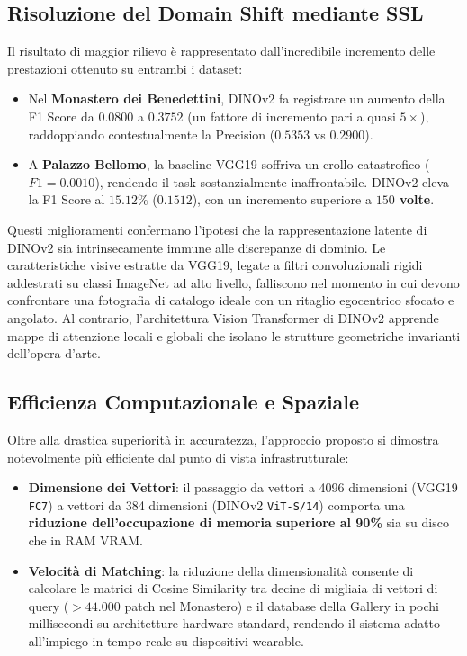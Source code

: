 \documentclass[a4paper,12pt]{report}
\begin{document}
\subsection{Risoluzione del Domain Shift mediante SSL}

Il risultato di maggior rilievo è rappresentato dall'incredibile incremento delle prestazioni ottenuto su entrambi i dataset:
\begin{itemize}
    \item Nel \textbf{Monastero dei Benedettini}, DINOv2 fa registrare un aumento della F1 Score da $0.0800$ a $0.3752$ (un fattore di incremento pari a quasi \textbf{$5\times$}), raddoppiando contestualmente la Precision ($0.5353$ vs $0.2900$).
    \item A \textbf{Palazzo Bellomo}, la baseline VGG19 soffriva un crollo catastrofico ($F1 = 0.0010$), rendendo il task sostanzialmente inaffrontabile. DINOv2 eleva la F1 Score al \textbf{$15.12\%$} ($0.1512$), con un incremento superiore a \textbf{$150$ volte}.
\end{itemize}

Questi miglioramenti confermano l'ipotesi che la rappresentazione latente di DINOv2 sia intrinsecamente immune alle discrepanze di dominio. Le caratteristiche visive estratte da VGG19, legate a filtri convoluzionali rigidi addestrati su classi ImageNet ad alto livello, falliscono nel momento in cui devono confrontare una fotografia di catalogo ideale con un ritaglio egocentrico sfocato e angolato. Al contrario, l'architettura Vision Transformer di DINOv2 apprende mappe di attenzione locali e globali che isolano le strutture geometriche invarianti dell'opera d'arte.

\subsection{Efficienza Computazionale e Spaziale}

Oltre alla drastica superiorità in accuratezza, l'approccio proposto si dimostra notevolmente più efficiente dal punto di vista infrastrutturale:
\begin{itemize}
    \item \textbf{Dimensione dei Vettori}: il passaggio da vettori a 4096 dimensioni (VGG19 \texttt{FC7}) a vettori da 384 dimensioni (DINOv2 \texttt{ViT-S/14}) comporta una \textbf{riduzione dell'occupazione di memoria superiore al 90\%} sia su disco che in RAM VRAM.
    \item \textbf{Velocità di Matching}: la riduzione della dimensionalità consente di calcolare le matrici di Cosine Similarity tra decine di migliaia di vettori di query ($>44.000$ patch nel Monastero) e il database della Gallery in pochi millisecondi su architetture hardware standard, rendendo il sistema adatto all'impiego in tempo reale su dispositivi wearable.
\end{itemize}
\end{document}
